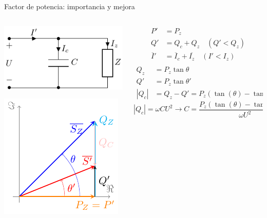 \documentclass[aspectratio=169, xcolor={usenames,svgnames,dvipsnames}]{beamer}
\begin{document}
\begin{frame}{Factor de potencia: importancia y mejora}
\begin{columns}
\begin{column}{0.4\linewidth}
\begin{center}
\includegraphics[width=\linewidth]{../figs/circuitocompensacionreactiva.pdf}
\end{center}
\begin{center}
\includegraphics[width=0.65\linewidth]{../figs/trianguloCompensacionQ.pdf}
\end{center}
\end{column}
\begin{column}{0.6\linewidth}
\begin{align*}
  P' &= P_z\\
  Q' &= Q_c + Q_z \quad (Q' < Q_z)\\
  \overline{I}' &= \overline{I}_c + \overline{I_z} \quad (I' < I_z)\\
\end{align*}
\begin{align*}
Q_z &= P_z \tan \theta\\
Q'&= P_z \tan \theta'\\
|Q_c| &= Q_z - Q' = P_z (\tan (\theta) - \tan (\theta'))
\end{align*}
\[
|Q_c| = \omega C U^2 \rightarrow \boxed{C = \frac{P_z (\tan (\theta) - \tan (\theta'))}{\omega U^2}}
\]
\end{column}
\end{columns}
\end{frame}
\end{document}
